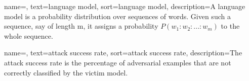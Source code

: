 {
    name=,
    text=language model,
    sort=language model,
    description={A language model is a probability distribution over sequences of words. Given such a sequence, say of length m, it assigns a probability $P(w_1:w_2:...:w_m)$ to the whole sequence.}
}

{
    name=,
    text=attack success rate,
    sort=attack success rate,
    description={The attack success rate is the percentage of adversarial examples that are not correctly classified by the victim model.}
}




